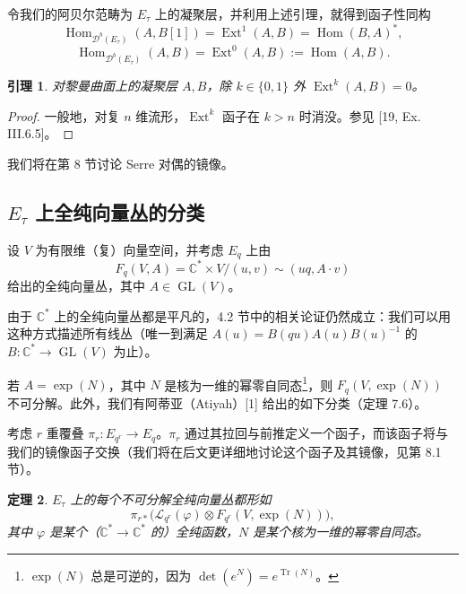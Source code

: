 \documentclass[11pt,a4paper]{article}
\theoremstyle{plain}
\newtheorem{theorem}{定理}[section]
\newtheorem{lemma}[theorem]{引理}
\theoremstyle{definition}
\begin{document}
令我们的阿贝尔范畴为 $E_\tau$ 上的凝聚层，并利用上述引理，就得到函子性同构
\[
  \operatorname{Hom}_{\mathcal{D}^b(E_\tau)}(A,B[1])=\operatorname{Ext}^1(A,B)=\operatorname{Hom}(B,A)^*,
\]
\[
  \operatorname{Hom}_{\mathcal{D}^b(E_\tau)}(A,B)=\operatorname{Ext}^0(A,B):=\operatorname{Hom}(A,B).
\]

\begin{lemma}
对黎曼曲面上的凝聚层 $A,B$，除 $k\in\{0,1\}$ 外 $\operatorname{Ext}^k(A,B)=0$。
\end{lemma}

\begin{proof}
一般地，对复 $n$ 维流形，$\operatorname{Ext}^k$ 函子在 $k>n$ 时消没。参见 [19, Ex. III.6.5]。
\end{proof}


我们将在第 8 节讨论 Serre 对偶的镜像。

\subsection{$E_\tau$ 上全纯向量丛的分类}

设 $V$ 为有限维（复）向量空间，并考虑 $E_q$ 上由
\[
  F_q(V,A)=\mathbb{C}^*\times V/(u,v)\sim(uq,A\cdot v)
\]
给出的全纯向量丛，其中 $A\in\operatorname{GL}(V)$。

由于 $\mathbb{C}^*$ 上的全纯向量丛都是平凡的，4.2 节中的相关论证仍然成立：我们可以用这种方式描述所有线丛（唯一到满足 $A(u)=B(qu)A(u)B(u)^{-1}$ 的 $B:\mathbb{C}^*\to\operatorname{GL}(V)$ 为止）。

若 $A=\exp(N)$，其中 $N$ 是核为一维的幂零自同态\footnote{$\exp(N)$ 总是可逆的，因为 $\det(e^N)=e^{\operatorname{Tr}(N)}$。}，则 $F_q(V,\exp(N))$ 不可分解。此外，我们有阿蒂亚（Atiyah）[1] 给出的如下分类（定理 7.6）。

考虑 $r$ 重覆叠 $\pi_r:E_{q^r}\to E_q$。$\pi_r$ 通过其拉回与前推定义一个函子，而该函子将与我们的镜像函子交换（我们将在后文更详细地讨论这个函子及其镜像，见第 8.1 节）。

\begin{theorem}
$E_\tau$ 上的每个不可分解全纯向量丛都形如
\[
  \pi_{r*}\bigl(\mathcal{L}_{q^r}(\varphi)\otimes F_{q^r}(V,\exp(N))\bigr),
\]
其中 $\varphi$ 是某个（$\mathbb{C}^*\to\mathbb{C}^*$ 的）全纯函数，$N$ 是某个核为一维的幂零自同态。
\end{theorem}
\end{document}

